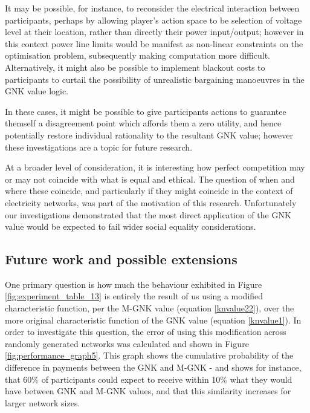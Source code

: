 It may be possible, for instance, to reconsider the electrical interaction between participants, perhaps by allowing player's action space to be selection of voltage level at their location, rather than directly their power input/output; however in this context power line limits would be manifest as non-linear constraints on the optimisation problem, subsequently making computation more difficult.
Alternatively, it might also be possible to implement blackout costs to participants to curtail the possibility of unrealistic bargaining manoeuvres in the GNK value logic.

In these cases, it might be possible to give participants actions to guarantee themself a disagreement point which affords them a zero utility, and hence potentially restore individual rationality to the resultant GNK value; however these investigations are a topic for future research.

At a broader level of consideration, it is interesting how perfect competition may or may not coincide with what is equal and ethical.
The question of when and where these coincide, and particularly if they might coincide in the context of electricity networks, was part of the motivation of this research.
Unfortunately our investigations demonstrated that the most direct application of the GNK value would be expected to fail wider social equality considerations.



\subsection{Future work and possible extensions}\label{sec:GNK_extensions_discussion}

One primary question is how much the behaviour exhibited in Figure \ref{fig:experiment_table_13} is entirely the result of us using a modified characteristic function, per the M-GNK value (equation \ref{knvalue22}), over the more original characteristic function of the GNK value (equation \ref{knvalue1}).
In order to investigate this question, the error of using this modification across randomly generated networks was calculated and shown in Figure \ref{fig:performance_graph5}.
This graph shows the cumulative probability of the difference in payments between the GNK and M-GNK - and shows for instance, that 60\% of participants could expect to receive within 10\% what they would have between GNK and M-GNK values, and that this similarity increases for larger network sizes.

